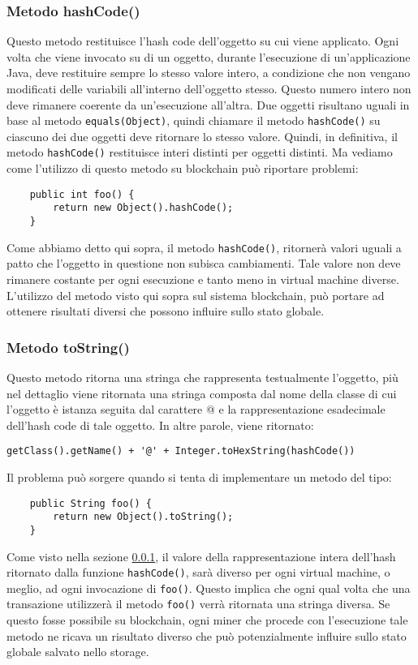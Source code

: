 			\subsubsection{Metodo hashCode()}
			\label{object-hashcode}
				Questo metodo restituisce l'hash code dell'oggetto su cui viene applicato. Ogni volta che viene invocato su di un oggetto, durante l'esecuzione di un'applicazione Java, deve restituire sempre lo stesso valore intero, a condizione che non vengano modificati delle variabili all'interno dell'oggetto stesso. Questo numero intero non deve rimanere coerente da un'esecuzione all'altra. Due oggetti risultano uguali in base al metodo \lstinline|equals(Object)|, quindi chiamare il metodo \lstinline|hashCode()| su ciascuno dei due oggetti deve ritornare lo stesso valore. Quindi, in definitiva, il metodo \lstinline|hashCode()| restituisce interi distinti per oggetti distinti. Ma vediamo come l'utilizzo di questo metodo su blockchain può riportare problemi:
				\begin{lstlisting}
	public int foo() {
		return new Object().hashCode();
	}
				\end{lstlisting}
				Come abbiamo detto qui sopra, il metodo \lstinline|hashCode()|, ritornerà valori uguali a patto che l'oggetto in questione non subisca cambiamenti. Tale valore non deve rimanere costante per ogni esecuzione e tanto meno in virtual machine diverse. L'utilizzo del metodo visto qui sopra sul sistema blockchain, può portare ad ottenere risultati diversi che possono influire sullo stato globale.
			
			\subsubsection{Metodo toString()}
				Questo metodo ritorna una stringa che rappresenta testualmente l'oggetto, più nel dettaglio viene ritornata una stringa composta dal nome della classe di cui l'oggetto è istanza seguita dal carattere @ e la rappresentazione esadecimale dell'hash code di tale oggetto. In altre parole, viene ritornato:
				\begin{lstlisting}[numbers=none,frame=none]
	getClass().getName() + '@' + Integer.toHexString(hashCode())
				\end{lstlisting}
				Il problema può sorgere quando si tenta di implementare un metodo del tipo:
				\begin{lstlisting}
	public String foo() {
		return new Object().toString();
	}
				\end{lstlisting}
				Come visto nella sezione \ref{object-hashcode}, il valore della rappresentazione intera dell'hash ritornato dalla funzione \lstinline|hashCode()|, sarà diverso per ogni virtual machine, o meglio, ad ogni invocazione di \lstinline|foo()|. Questo implica che ogni qual volta che una transazione utilizzerà il metodo \lstinline|foo()| verrà ritornata una stringa diversa. Se questo fosse possibile su blockchain, ogni miner che procede con l'esecuzione tale metodo ne ricava un risultato diverso che può potenzialmente influire sullo stato globale salvato nello storage.
	
